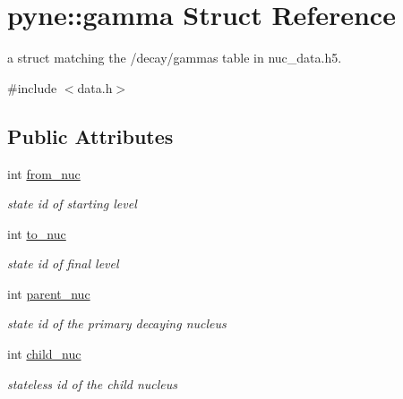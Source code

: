 \hypertarget{structpyne_1_1gamma}{}\section{pyne\+:\+:gamma Struct Reference}
\label{structpyne_1_1gamma}


a struct matching the \textquotesingle{}/decay/gammas\textquotesingle{} table in nuc\+\_\+data.\+h5.  




{\ttfamily \#include $<$data.\+h$>$}

\subsection*{Public Attributes}
\begin{DoxyCompactItemize}
\item 
\mbox{\label{structpyne_1_1gamma_a1c5b7ef9f75c628193a0872c9ae172e4}} 
int \hyperlink{structpyne_1_1gamma_a1c5b7ef9f75c628193a0872c9ae172e4}{from\+\_\+nuc}
\begin{DoxyCompactList}\small\item\em state id of starting level \end{DoxyCompactList}\item 
\mbox{\label{structpyne_1_1gamma_af9ed390289a667c82464c859dbccb0a4}} 
int \hyperlink{structpyne_1_1gamma_af9ed390289a667c82464c859dbccb0a4}{to\+\_\+nuc}
\begin{DoxyCompactList}\small\item\em state id of final level \end{DoxyCompactList}\item 
\mbox{\label{structpyne_1_1gamma_a947386fa2557f57cc14f79d6904185bd}} 
int \hyperlink{structpyne_1_1gamma_a947386fa2557f57cc14f79d6904185bd}{parent\+\_\+nuc}
\begin{DoxyCompactList}\small\item\em state id of the primary decaying nucleus \end{DoxyCompactList}\item 
\mbox{\label{structpyne_1_1gamma_a99fcb3ccd78db851f7104ff3ab59048d}} 
int \hyperlink{structpyne_1_1gamma_a99fcb3ccd78db851f7104ff3ab59048d}{child\+\_\+nuc}
\begin{DoxyCompactList}\small\item\em stateless id of the child nucleus \end{DoxyCompactList}\item 

\end{DoxyCompactItemize}

